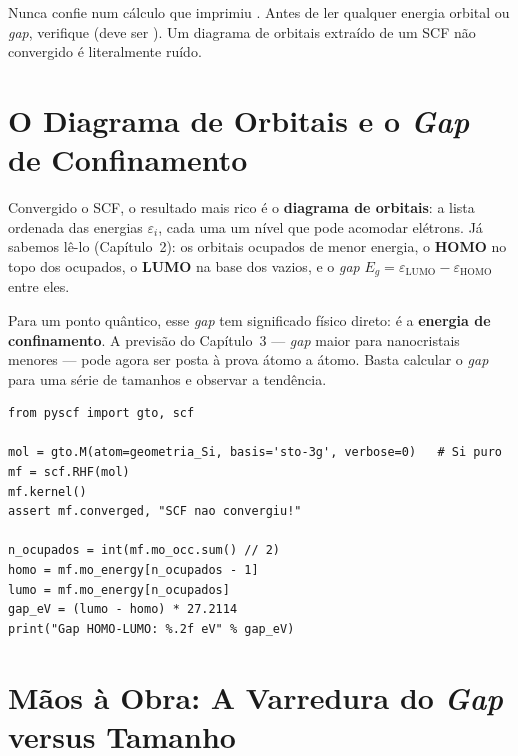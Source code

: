 \begin{caixaatencao}
Nunca confie num cálculo que imprimiu . Antes de ler
qualquer energia orbital ou \emph{gap}, verifique  (deve ser
). Um diagrama de orbitais extraído de um SCF não convergido é
literalmente ruído.
\end{caixaatencao}

\section{O Diagrama de Orbitais e o \emph{Gap} de Confinamento}
\label{sec:diagrama}

Convergido o SCF, o resultado mais rico é o \textbf{diagrama de orbitais}: a lista
ordenada das energias $\varepsilon_i$, cada uma um nível que pode acomodar
elétrons. Já sabemos lê-lo (Capítulo~2): os orbitais ocupados de menor energia,
o \textbf{HOMO} no topo dos ocupados, o \textbf{LUMO} na base dos vazios, e o
\emph{gap} $E_g = \varepsilon_{\text{LUMO}} - \varepsilon_{\text{HOMO}}$ entre
eles.

Para um ponto quântico, esse \emph{gap} tem significado físico direto: é a
\textbf{energia de confinamento}. A previsão do Capítulo~3 --- \emph{gap} maior
para nanocristais menores --- pode agora ser posta à prova átomo a átomo. Basta
calcular o \emph{gap} para uma série de tamanhos e observar a tendência.

\begin{lstlisting}[style=python,caption={Extraindo o \emph{gap} de um nanocristal.},label={lst:gapextrai}]
from pyscf import gto, scf

mol = gto.M(atom=geometria_Si, basis='sto-3g', verbose=0)   # Si puro
mf = scf.RHF(mol)
mf.kernel()
assert mf.converged, "SCF nao convergiu!"

n_ocupados = int(mf.mo_occ.sum() // 2)
homo = mf.mo_energy[n_ocupados - 1]
lumo = mf.mo_energy[n_ocupados]
gap_eV = (lumo - homo) * 27.2114
print("Gap HOMO-LUMO: %.2f eV" % gap_eV)
\end{lstlisting}

\section{Mãos à Obra: A Varredura do \emph{Gap} versus Tamanho}
\label{sec:maos4}

